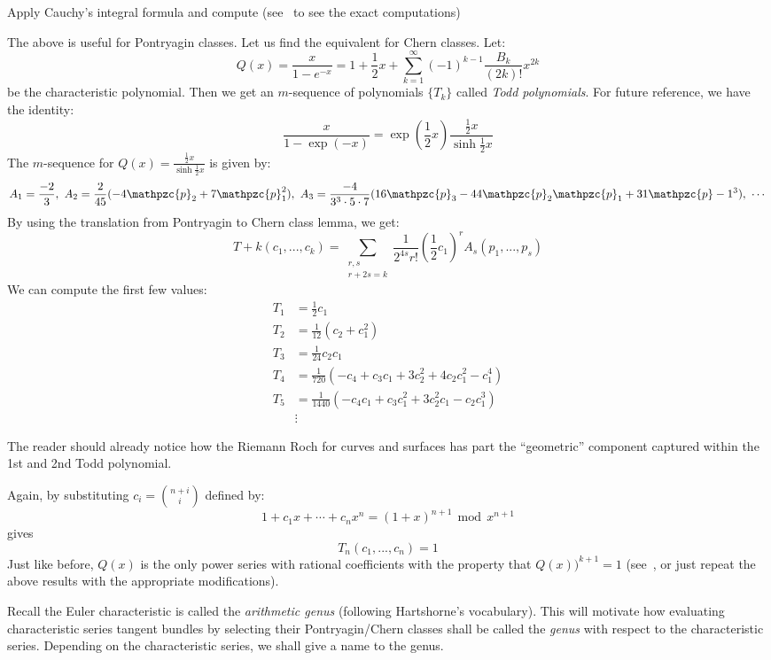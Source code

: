 \documentclass{book}
\newcommand{\cp}{{\mathpzc{p}}}
\renewcommand{\mod}{\,\operatorname{mod}\,}
\begin{document}
\begin{Proof}
  Apply Cauchy's integral formula and compute (see~\cite[p.12]{hirzebruchTopologicalMethodsAlgebraic1995} to
  see the exact computations)
\end{Proof}

The above is useful for Pontryagin classes. Let us find the equivalent for Chern classes. Let:
\[
  Q(x) = \frac{x}{1-e^{-x}} = 1 + \frac{1}{2}x + \sum_{k=1}^\infty (-1)^{k-1} \frac{B_k}{(2k)!}x^{2k}
\]
be the characteristic polynomial. Then we get an $m$-sequence of polynomials $\{T_k\}$ called \emph{Todd
polynomials}. For future reference, we have the identity:
\[
  \frac{x}{1-\exp(-x)} = \exp \left(\frac{1}{2}x\right) \frac{\frac{1}{2}x}{\sinh \frac{1}{2}x}
\]
The $m$-sequence for $Q(x) = \frac{\frac{1}{2}x}{\sinh \frac{1}{2}x}$ is given by:
\[
  A_1 = \frac{-2}{3},\ A_2 = \frac{2}{45}(-4\cp_2+7\cp_1^2),\  A_3 = \frac{-4}{3^3\cdot 5\cdot 7}(16\cp_3
  -44\cp_2\cp_1 + 31\cp-1^3),\ \cdots
\]
By using the translation from Pontryagin to Chern class lemma, we get:
\[
  T+k(c_1, ..., c_k) = \sum_{\substack{r,s\\r+2s=k}} \frac{1}{2^{4s}r!} \left(\frac{1}{2}c_1\right)^r A_s(p_1, ..., p_s)
\]
We can compute the first few values:
\begin{align*}
  T_1 &= \frac{1}{2}c_1\\
  T_2 &= \frac{1}{12} (c_2 + c_1^2)\\
  T_3 &= \frac{1}{24} c_2c_1\\
  T_4 &= \frac{1}{720} (-c_4 + c_3c_1 + 3c_2^2 + 4c_2c_1^2 - c_1^4)\\
  T_5 &= \frac{1}{1440} \left(-c_4c_1 + c_3c_1^2  +3c_2^2c_1 - c_2c_1^3\right) \\
      &\vdots
\end{align*}

The reader should already notice how the Riemann Roch for curves and surfaces has part the ``geometric''
component captured within the 1st and 2nd Todd polynomial.

Again, by substituting $c_i = \binom{n+i}{i}$ defined by:
\[
  1 + c_1x + \cdots + c_nx^n = (1+x)^{n+1} \mod x^{n+1}
\]
gives
\[
  T_n(c_1, ..., c_n) = 1
\]
Just like before, $Q(x)$ is the only power series with rational coefficients with the property that
$Q(x))^{k+1} = 1$ (see~\cite[p.14]{hirzebruchTopologicalMethodsAlgebraic1995}, or just repeat the above
results with the appropriate modifications).

Recall the Euler characteristic is called the \emph{arithmetic genus} (following Hartshorne's vocabulary).
This will motivate how evaluating characteristic series tangent bundles by selecting their Pontryagin/Chern
classes shall be called the \emph{genus} with respect to the characteristic series. Depending on the
characteristic series, we shall give a name to the genus.
\end{document}
